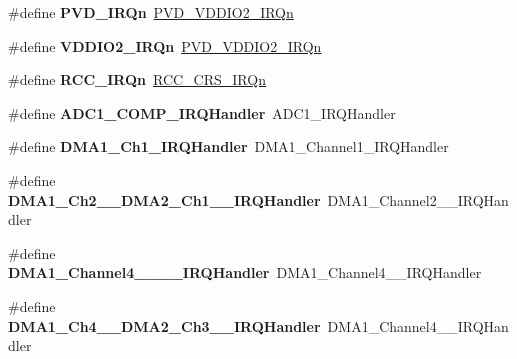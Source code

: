 \begin{DoxyCompactItemize}
\#define {\bfseries P\+V\+D\+\_\+\+I\+R\+Qn}~\hyperlink{group___peripheral__interrupt__number__definition_gga7e1129cd8a196f4284d41db3e82ad5c8aa909ccc6b6fba8e8ef1ff5e8989f5ffe}{P\+V\+D\+\_\+\+V\+D\+D\+I\+O2\+\_\+\+I\+R\+Qn}
\item 
\mbox{\label{group__stm32f042x6_gab750c5433c43339b438d26f821de6a7a}} 
\#define {\bfseries V\+D\+D\+I\+O2\+\_\+\+I\+R\+Qn}~\hyperlink{group___peripheral__interrupt__number__definition_gga7e1129cd8a196f4284d41db3e82ad5c8aa909ccc6b6fba8e8ef1ff5e8989f5ffe}{P\+V\+D\+\_\+\+V\+D\+D\+I\+O2\+\_\+\+I\+R\+Qn}
\item 
\mbox{\label{group__stm32f042x6_gaae92cbf893c67700dbc28d2ca87eac9d}} 
\#define {\bfseries R\+C\+C\+\_\+\+I\+R\+Qn}~\hyperlink{group___peripheral__interrupt__number__definition_gga7e1129cd8a196f4284d41db3e82ad5c8a112217f6b94af93192099fb66f896608}{R\+C\+C\+\_\+\+C\+R\+S\+\_\+\+I\+R\+Qn}
\item 
\mbox{\label{group__stm32f042x6_gaeb3545df015f964b68346cda78f7cea5}} 
\#define {\bfseries A\+D\+C1\+\_\+\+C\+O\+M\+P\+\_\+\+I\+R\+Q\+Handler}~A\+D\+C1\+\_\+\+I\+R\+Q\+Handler
\item 
\mbox{\label{group__stm32f042x6_ga3f7debe9fc2548ab6640825967110101}} 
\#define {\bfseries D\+M\+A1\+\_\+\+Ch1\+\_\+\+I\+R\+Q\+Handler}~D\+M\+A1\+\_\+\+Channel1\+\_\+\+I\+R\+Q\+Handler
\item 
\mbox{\label{group__stm32f042x6_ga3752ab0b9a6635ccd7bc87b99ee8fd9b}} 
\#define {\bfseries D\+M\+A1\+\_\+\+Ch2\+\_\+\_\+\+D\+M\+A2\+\_\+\+Ch1\+\_\+\_\+\+I\+R\+Q\+Handler}~D\+M\+A1\+\_\+\+Channel2\+\_\+\_\+\+I\+R\+Q\+Handler
\item 
\mbox{\label{group__stm32f042x6_gae3db46ad17e9f800e0f88b489eed522d}} 
\#define {\bfseries D\+M\+A1\+\_\+\+Channel4\+\_\+\_\+\_\+\_\+\+I\+R\+Q\+Handler}~D\+M\+A1\+\_\+\+Channel4\+\_\+\_\+\+I\+R\+Q\+Handler
\item 
\mbox{\label{group__stm32f042x6_ga035f9aa47c046222541cca70e281b415}} 
\#define {\bfseries D\+M\+A1\+\_\+\+Ch4\+\_\+\_\+\+D\+M\+A2\+\_\+\+Ch3\+\_\+\_\+\+I\+R\+Q\+Handler}~D\+M\+A1\+\_\+\+Channel4\+\_\+\_\+\+I\+R\+Q\+Handler

\end{DoxyCompactItemize}
